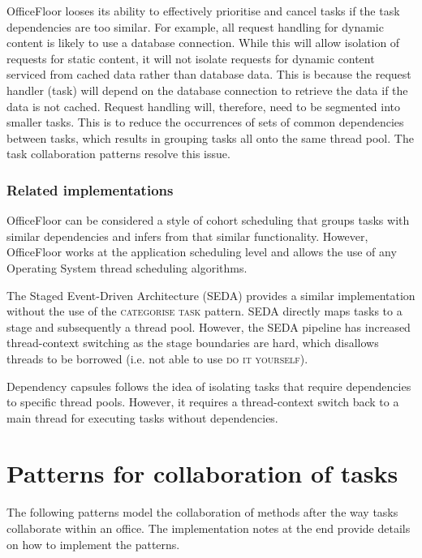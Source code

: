 \documentclass[prodmode]{style/acmlarge}
\begin{document}
OfficeFloor looses its ability to effectively prioritise and cancel tasks if the
task dependencies are too similar.  For example, all request handling for
dynamic content is likely to use a database connection.  While this will allow
isolation of requests for static content, it will not isolate requests for
dynamic content serviced from cached data rather than database data.  This is
because the request handler (task) will depend on the database connection to
retrieve the data if the data is not cached.  Request handling will, therefore,
need to be segmented into smaller tasks.  This is to reduce the occurrences of
sets of common dependencies between tasks, which results in grouping tasks all
onto the same thread pool.  The task collaboration patterns resolve this issue.


\subsubsection*{Related implementations}

OfficeFloor can be considered a style of cohort scheduling \cite{cohort}
that groups tasks with similar dependencies and infers from that similar
functionality.  However, OfficeFloor works at the application scheduling
level and allows the use of any Operating System thread scheduling algorithms.

The Staged Event-Driven Architecture (SEDA) \cite{seda} provides a similar
implementation without the use of the \textsc{categorise task} pattern.
SEDA directly maps tasks to a stage and subsequently a thread pool.
However, the SEDA pipeline has increased thread-context switching as the stage
boundaries are hard, which disallows threads to be borrowed (i.e. not able to
use \textsc{do it yourself}).

Dependency capsules \cite{dependency-capsules} follows the idea of isolating
tasks that require dependencies to specific thread pools.  However, it
requires a thread-context switch back to a main thread for executing tasks
without dependencies.



\section{Patterns for collaboration of tasks}

The following patterns model the collaboration of methods after the way tasks
collaborate within an office.  The implementation notes at the end provide
details on how to implement the patterns.
\end{document}

